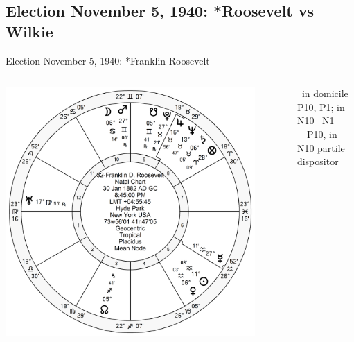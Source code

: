 \subsection{Election November 5, 1940: *Roosevelt vs Wilkie}
\begin{frame}[t]{Election November 5, 1940: *Franklin Roosevelt}
\small

\begin{columns}[T, onlytextwidth]
\vspace{-1em}
{\includegraphics[width=0.9\textwidth]{charts/FDR.png}}
\fontsize{7pt}{8pt}\selectfont

\Moon\, in domicile \Sextile\, P10, P1; in N10 \Square\, N1 \\
\Mars\, \Sextile\, P10, in N10 partile \Trine\, dispositor


\end{columns}
\end{frame}
